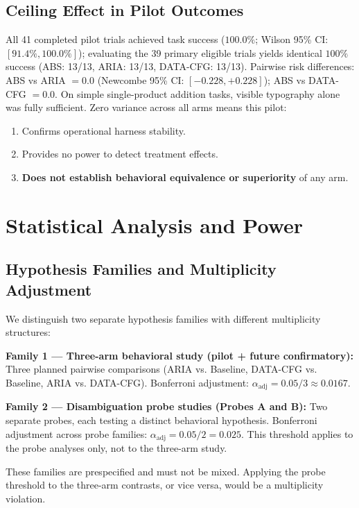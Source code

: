 \documentclass[conference]{IEEEtran}
\begin{document}
\subsection{Ceiling Effect in Pilot Outcomes}

All 41 completed pilot trials achieved task success ($100.0\%$; Wilson 95\% CI: $[91.4\%, 100.0\%]$); evaluating the 39 primary eligible trials yields identical $100\%$ success (ABS: 13/13, ARIA: 13/13, DATA-CFG: 13/13). Pairwise risk differences: ABS vs ARIA $= 0.0$ (Newcombe 95\% CI: $[-0.228, +0.228]$); ABS vs DATA-CFG $= 0.0$. On simple single-product addition tasks, visible typography alone was fully sufficient. Zero variance across all arms means this pilot:
\begin{enumerate}
    \item Confirms operational harness stability.
    \item Provides no power to detect treatment effects.
    \item \textbf{Does not establish behavioral equivalence or superiority} of any arm.
\end{enumerate}

\section{Statistical Analysis and Power}
\label{sec:stats}

\subsection{Hypothesis Families and Multiplicity Adjustment}

We distinguish two separate hypothesis families with different multiplicity structures:

\textbf{Family 1 --- Three-arm behavioral study (pilot + future confirmatory):} Three planned pairwise comparisons (ARIA vs. Baseline, DATA-CFG vs. Baseline, ARIA vs. DATA-CFG). Bonferroni adjustment: $\alpha_{\mathrm{adj}} = 0.05/3 \approx 0.0167$.

\textbf{Family 2 --- Disambiguation probe studies (Probes A and B):} Two separate probes, each testing a distinct behavioral hypothesis. Bonferroni adjustment across probe families: $\alpha_{\mathrm{adj}} = 0.05/2 = 0.025$. This threshold applies to the probe analyses only, not to the three-arm study.

These families are prespecified and must not be mixed. Applying the probe threshold to the three-arm contrasts, or vice versa, would be a multiplicity violation.
\end{document}
